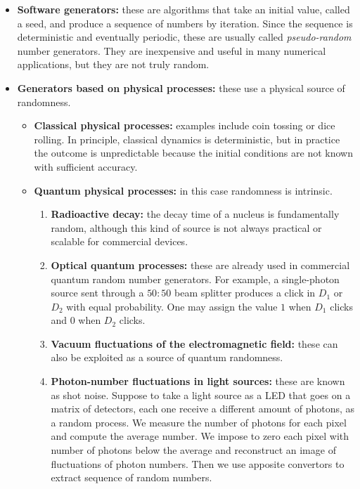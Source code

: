 \begin{itemize}
    \item \textbf{Software generators:} these are algorithms that take an initial value, called a seed, and produce a sequence of numbers by iteration. Since the sequence is deterministic and eventually periodic, these are usually called \emph{pseudo-random} number generators. They are inexpensive and useful in many numerical applications, but they are not truly random.
    
    \item \textbf{Generators based on physical processes:} these use a physical source of randomness.
    \begin{itemize}
        \item \textbf{Classical physical processes:} examples include coin tossing or dice rolling. In principle, classical dynamics is deterministic, but in practice the outcome is unpredictable because the initial conditions are not known with sufficient accuracy.
        
        \item \textbf{Quantum physical processes:} in this case randomness is intrinsic.
        \begin{enumerate}
            \item \textbf{Radioactive decay:} the decay time of a nucleus is fundamentally random, although this kind of source is not always practical or scalable for commercial devices.
            
            \item \textbf{Optical quantum processes:} these are already used in commercial quantum random number generators. For example, a single-photon source sent through a $50{:}50$ beam splitter produces a click in $D_1$ or $D_2$ with equal probability. One may assign the value $1$ when $D_1$ clicks and $0$ when $D_2$ clicks.
            
            \item \textbf{Vacuum fluctuations of the electromagnetic field:} these can also be exploited as a source of quantum randomness.
            
            \item \textbf{Photon-number fluctuations in light sources:} these are known as shot noise. Suppose to take a light source as a LED that goes on a matrix of detectors, each one receive a different amount of photons, as a random process. We measure the number of photons for each pixel and compute the average number. We impose to zero each pixel with number of photons below the average and reconstruct an image of fluctuations of photon numbers. Then we use apposite convertors to extract sequence of random numbers.
        \end{enumerate}
    \end{itemize}
\end{itemize}